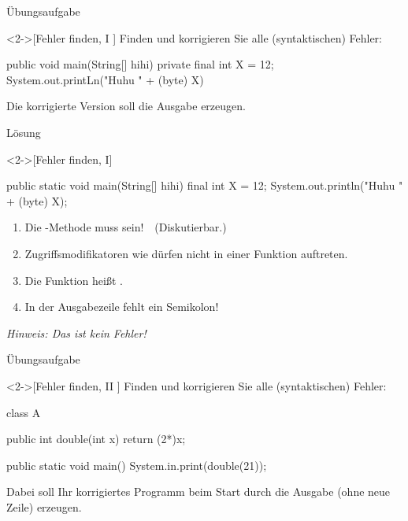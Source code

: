 \ifull
\begin{frame}[c,fragile]{Übungsaufgabe}
    \begin{exercise}<2->[Fehler finden, I ]
        \pause{}Finden und korrigieren Sie alle (syntaktischen) Fehler:\pause{}
        \begin{plainvoid}
public void main(String[] hihi) {
    private final int X = 12;
    System.out.printLn("Huhu " + (byte) X)
}
        \end{plainvoid}
    Die korrigierte Version soll die Ausgabe  erzeugen.
    \end{exercise}
\end{frame}

\begin{frame}[c,fragile]{Lösung}
    \begin{solve}<2->[Fehler finden, I]
        \pause{}\begin{plainjava}
public static void main(String[] hihi) {
    final int X = 12;
    System.out.println("Huhu " + (byte) X);
}
        \end{plainjava}
    \begin{enumerate}[<+(1)->]
        \item Die -Methode muss  sein!~~(Diskutierbar.)
        \item Zugriffsmodifikatoren wie  dürfen nicht in einer Funktion auftreten.
        \item Die Funktion  heißt .
        \item In der Ausgabezeile fehlt ein Semikolon!
    \end{enumerate}
    \pause{}\textit{Hinweis: Das  ist kein Fehler!}
    \end{solve}
\end{frame}

\begin{frame}[c,fragile]{Übungsaufgabe}
    \begin{exercise}<2->[Fehler finden, II ]
        \pause{}Finden und korrigieren Sie alle (syntaktischen) Fehler:\pause{}
        \begin{plainvoid}
class A {
    public int double(int x) { return (2*)x; }

    public static void main() {
        System.in.print(double(21));
    }
}
        \end{plainvoid}
        \pause{}Dabei soll Ihr korrigiertes Programm beim Start durch  die Ausgabe  (ohne neue Zeile) erzeugen.
    \end{exercise}
\end{frame}

